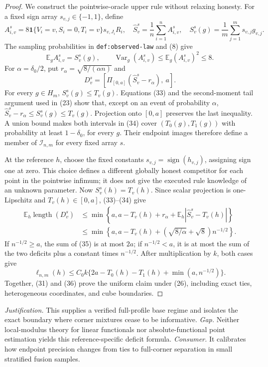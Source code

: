 \documentclass{article}
\begin{document}
\begin{proof}
We construct the pointwise-oracle upper rule without relaxing honesty.
For a fixed sign array \(s_{v,j}\in\{-1,1\}\), define
\[
 A_{i,v}^{s}=8\mathbf1\{V_i=v,S_i=0,T_i=v\}s_{v,J_i}R_i,
 \quad
 \widehat S_v^{s}=\frac1n\sum_{i=1}^nA_{i,v}^{s},
 \quad
 S_v^{s}(g)=\frac1m\sum_{j=1}^ms_{v,j}g_{v,j}.                           \tag{32}
\]
The sampling probabilities in \texttt{def:observed-law} and (8) give
\[
 \mathbb E_gA_{i,v}^{s}=S_v^{s}(g),\qquad
 \operatorname{Var}_g(A_{i,v}^{s})\le\mathbb E_g(A_{i,v}^{s})^2\le8.    \tag{33}
\]
For \(\alpha=\delta_0/2\), put \(r_\alpha=\sqrt{8/(\alpha n)}\) and
\[
 D_v^s=\left[
 \Pi_{[0,a]}(\widehat S_v^s-r_\alpha),\ a\right].                       \tag{34}
\]
For every \(g\in H_m\), \(S_v^s(g)\le T_v(g)\).  Equations (33) and the
second-moment tail argument used in (23) show that, except on an event of
probability \(\alpha\),
\(\widehat S_v^s-r_\alpha\le S_v^s(g)\le T_v(g)\).  Projection onto
\([0,a]\) preserves the last inequality.  A union bound makes both intervals
in (34) cover \((T_0(g),T_1(g))\) with probability at least
\(1-\delta_0\), for every \(g\).  Their endpoint images therefore define a
member of \(\mathcal I_{n,m}\) for every fixed array \(s\).

At the reference \(h\), choose the fixed constants
\(s_{v,j}=\operatorname{sign}(h_{v,j})\), assigning sign one at zero.  This
choice defines a different globally honest competitor for each point in the
pointwise infimum; it does not give the executed rule knowledge of an unknown
parameter.  Now \(S_v^s(h)=T_v(h)\).  Since scalar projection is
one-Lipschitz and \(T_v(h)\in[0,a]\), (33)--(34) give
\[
 \begin{split}
 \mathbb E_h\operatorname{length}(D_v^s)
 &\le\min\left\{a,
 a-T_v(h)+r_\alpha+\mathbb E_h|\widehat S_v^s-T_v(h)|\right\}\\
 &\le\min\left\{a,a-T_v(h)+
 \left(\sqrt{8/\alpha}+\sqrt8\right)n^{-1/2}\right\}.                  \tag{35}
 \end{split}
\]
If \(n^{-1/2}\ge a\), the sum of (35) is at most \(2a\); if
\(n^{-1/2}<a\), it is at most the sum of the two deficits plus a constant
times \(n^{-1/2}\).  After multiplication by \(k\), both cases give
\[
 \ell_{n,m}(h)\le
 C_0k\{2a-T_0(h)-T_1(h)+\min(a,n^{-1/2})\}.                              \tag{36}
\]
Together, (31) and (36) prove the uniform claim under (26), including exact
ties, heterogeneous coordinates, and cube boundaries.
\end{proof}
\par\smallskip\noindent \textit{Justification.} This supplies a verified full-profile base regime and isolates the exact boundary where corner mixtures cease to be informative. \textit{Gap.} Neither local-modulus theory for linear functionals nor absolute-functional point estimation yields this reference-specific deficit formula. \textit{Consumer.} It calibrates how endpoint precision changes from ties to full-corner separation in small stratified fusion samples.
\end{document}

